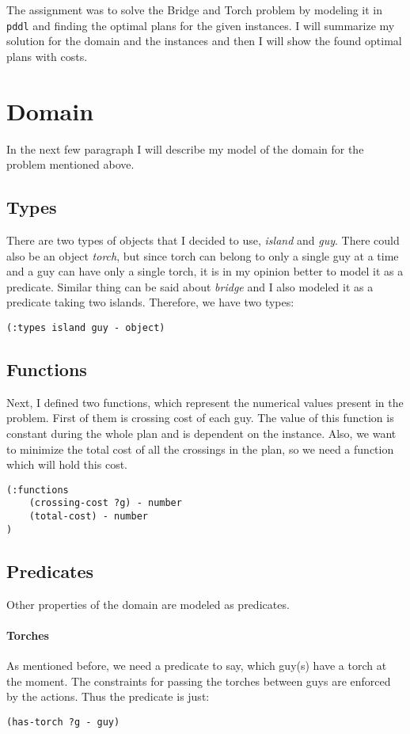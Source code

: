 \documentclass[a4paper,11pt]{article}
\begin{document}
The assignment was to solve the Bridge and Torch problem by modeling it in \texttt{pddl} and finding the optimal plans for the given instances.
I will summarize my solution for the domain and the instances and then I will show the found optimal plans with costs.

\section*{Domain}
In the next few paragraph I will describe my model of the domain for the problem mentioned above.

\subsection*{Types}
There are two types of objects that I decided to use, \textit{island} and \textit{guy}.
There could also be an object \textit{torch}, but since torch can belong to only a single guy at a time and a guy can have only a single torch, it is in my opinion better to model it as a predicate.
Similar thing can be said about \textit{bridge} and I also modeled it as a predicate taking two islands.
Therefore, we have two types:
\begin{verbatim}
(:types island guy - object)
\end{verbatim}

\subsection*{Functions}
Next, I defined two functions, which represent the numerical values present in the problem.
First of them is crossing cost of each guy.
The value of this function is constant during the whole plan and is dependent on the instance.
Also, we want to minimize the total cost of all the crossings in the plan, so we need a function which will hold this cost.
\begin{verbatim}
(:functions
    (crossing-cost ?g) - number
    (total-cost) - number
)
\end{verbatim}

\subsection*{Predicates}
Other properties of the domain are modeled as predicates.

\paragraph*{Torches}
As mentioned before, we need a predicate to say, which guy(s) have a torch at the moment.
The constraints for passing the torches between guys are enforced by the actions.
Thus the predicate is just:
\begin{verbatim}
(has-torch ?g - guy)
\end{verbatim}
\end{document}
